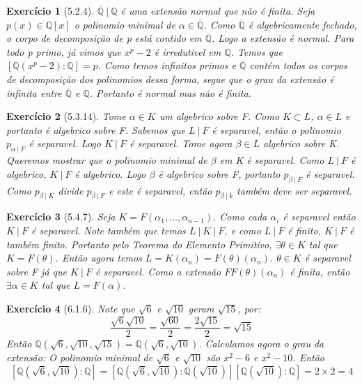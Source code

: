 \documentclass{article}
\newtheorem*{ex}{Exercício}
\begin{document}
\begin{ex}[5.2.4]
    $\overline{\mathbb{Q}} \: | \: \mathbb{Q}$ é uma extensão normal que não é finita.
    Seja $p(x) \in \mathbb{Q}[x]$ o polinomio minimal de $\alpha \in \overline{\mathbb{Q}}$.
    Como $\overline{\mathbb{Q}}$ é algebricamente fechado, o corpo de decomposição de p está contido em 
    $\overline{\mathbb{Q}}$. Logo a extensão é normal.
    Para todo p primo, já vimos que $x^p -2 $ é irredutivel em $\mathbb{Q}$.
    Temos que $[\mathbb{Q}(x^p -2 ): \mathbb{Q}] = p$.
    Como temos infinitos primos e $\overline{\mathbb{Q}}$ contém todos os corpos de decomposição 
    dos polinomios dessa forma, segue que o grau da extensão é infinita entre 
    $\overline{\mathbb{Q}}$ e $\mathbb{Q}$. Portanto é normal mas não é finita.
\end{ex}

\begin{ex}[5.3.14]
    Tome $\alpha \in K$ um algebrico sobre F. 
    Como $K \subset L$, $\alpha \in L$ e portanto é algebrico sobre F.
    Sabemos que $L \: | \: F$ é separavel, então o polinomio $p_{\alpha \: | \: F}$ é separavel.
    Logo $K \: | \: F$ é separavel.
    Tome agora $\beta \in L$ algebrico sobre K.
    Queremos mostrar que o polinomio minimal de $\beta$ em K é separavel.
    Como $L \: | \: F$ é algebrico, $K \: | \: F$ é algebrico. 
    Logo $\beta$ é algebrico sobre F, portanto $p_{\beta \: | \: F}$ é separavel.
    Como $p_{\beta \: | \: K}$ divide $p_{\beta \: | \: F}$ e este é separavel, então $p_{\beta \: | \: k}$
    também deve ser separavel.
\end{ex}

\begin{ex}[5.4.7]
    Seja $K = F(\alpha_1, \dots, \alpha_{n-1})$. 
    Como cada $\alpha_i$ é separavel então $K \: | \: F$ é separavel.
    Note também que temos $L \: | \: K \: | \: F$, e como $L \: | \: F$ é finito, $K \: | \: F$ é também finito.
    Portanto pelo Teorema do Elemento Primitivo, $\exists \theta \in K$ tal que $K = F(\theta)$.
    Então agora temos $L = K(\alpha_n) = F(\theta)(\alpha_n)$.
    $\theta \in K$ é separavel sobre F já que $K \: | \: F$ é separavel.
    Como a extensão $FF(\theta)(\alpha_n)$ é finita, então $\exists \alpha \in K$ tal que 
    $L = F(\alpha)$. 
\end{ex}

\begin{ex}[6.1.6]
    Note que $\sqrt{6}$ e $\sqrt{10}$ geram $\sqrt{15}$, por:
    \[\frac{\sqrt{6}\sqrt{10}}{2} = \frac{\sqrt{60}}{2} = \frac{2\sqrt{15}}{2} = \sqrt{15}\]
    Então $\mathbb{Q}(\sqrt{6}, \sqrt{10}, \sqrt{15}) = \mathbb{Q}(\sqrt{6}, \sqrt{10})$.
    Calculamos agora o grau da extensão:
    O polinomio minimal de $\sqrt{6}$ e $\sqrt{10}$ são $x^2 - 6$ e $x^2 - 10$.
    Então 
    \[[\mathbb{Q}(\sqrt{6}, \sqrt{10}): \mathbb{Q}] = [\mathbb{Q}(\sqrt{6}, \sqrt{10}): \mathbb{Q}(\sqrt{10})][\mathbb{Q}(\sqrt{10}): \mathbb{Q}] = 2 \times 2 = 4\]
\end{ex}
\end{document}
